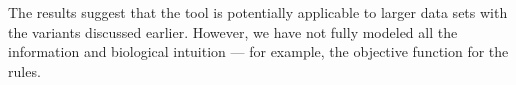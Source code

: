 
The results suggest that the tool is potentially applicable to larger data sets with
the variants discussed earlier. However, we have not fully modeled all the information
and biological intuition --- for example, the objective function for the rules.



